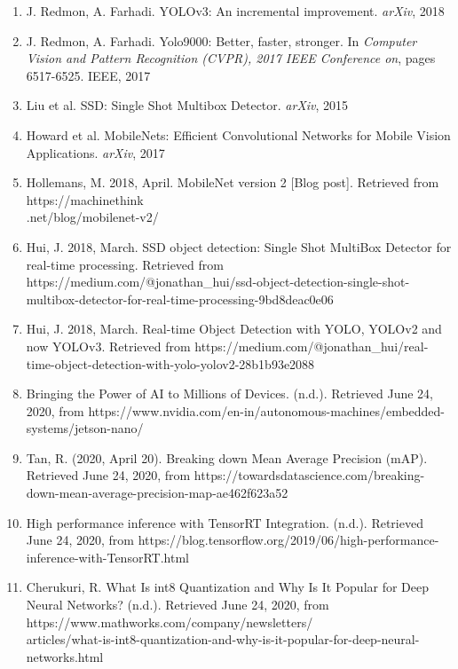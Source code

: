 \documentclass[12pt,letterpaper]{article}
\begin{document}
\begin{enumerate}

    \item J. Redmon, A. Farhadi. YOLOv3: An incremental improvement. \textit{arXiv}, 2018 

    \item J. Redmon, A. Farhadi. Yolo9000: Better, faster, stronger. In \textit{Computer Vision and Pattern Recognition (CVPR), 2017 IEEE Conference on}, pages 6517-6525. IEEE, 2017

    \item Liu et al. SSD: Single Shot Multibox Detector. \textit{arXiv}, 2015
    
    \item Howard et al. MobileNets: Efficient Convolutional Networks for Mobile Vision Applications. \textit{arXiv}, 2017

    \item Hollemans, M. 2018, April. MobileNet version 2 [Blog post]. Retrieved from https://machinethink \\.net/blog/mobilenet-v2/

    \item Hui, J. 2018, March. SSD object detection: Single Shot MultiBox Detector for real-time processing. Retrieved from https://medium.com/@jonathan\_hui/ssd-object-detection-single-shot-multibox-detector-for-real-time-processing-9bd8deac0e06

    \item Hui, J. 2018, March. Real-time Object Detection with YOLO, YOLOv2 and now YOLOv3. Retrieved from https://medium.com/@jonathan\_hui/real-time-object-detection-with-yolo-yolov2-28b1b93e2088

    \item Bringing the Power of AI to Millions of Devices. (n.d.). Retrieved June 24, 2020, from https://www.nvidia.com/en-in/autonomous-machines/embedded-systems/jetson-nano/

    \item Tan, R. (2020, April 20). Breaking down Mean Average Precision (mAP). Retrieved June 24, 2020, from https://towardsdatascience.com/breaking-down-mean-average-precision-map-ae462f623a52

    \item High performance inference with TensorRT Integration. (n.d.). Retrieved June 24, 2020, from https://blog.tensorflow.org/2019/06/high-performance-inference-with-TensorRT.html

    \item Cherukuri, R. What Is int8 Quantization and Why Is It Popular for Deep Neural Networks? (n.d.). Retrieved June 24, 2020, from https://www.mathworks.com/company/newsletters/ \\ articles/what-is-int8-quantization-and-why-is-it-popular-for-deep-neural-networks.html
\end{enumerate}
\end{document}
